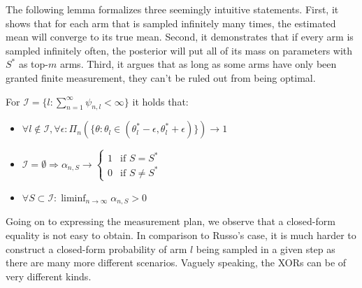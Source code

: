 The following lemma formalizes three seemingly intuitive statements. First,
it shows that for each arm that is sampled infinitely many times, the estimated
mean will converge to its true mean. Second, it demonstrates that if every arm
is sampled infinitely often, the posterior will put all of its mass on
parameters with $S^*$ as top-$m$ arms. Third, it argues that as long as some
arms have only been granted finite measurement, they can't be ruled out from
being optimal.
\begin{lemma}\label{lemma:finite_measurement}
  For $\mathcal{I} = \{l: \sum_{n=1}^\infty \psi_{n, l} < \infty\}$ it holds
      that:
  \begin{itemize}
    \item $\forall l \notin \mathcal{I}, \forall \epsilon: \Pi_n(\{\theta:
        \theta_l \in (\theta^*_l - \epsilon, \theta^*_l + \epsilon)\})
        \rightarrow 1$
    \item $\mathcal{I} = \emptyset \Rightarrow
    \alpha_{n, S} \rightarrow \begin{cases}
      1 & \text{if } S = S^*\\
      0 & \text{if } S \neq S^*
    \end{cases}$
    \item $\forall S \subset \mathcal{I}: \liminf_{n \rightarrow \infty}
        \alpha_{n, S} > 0$
  \end{itemize}
\end{lemma}
Going on to expressing the measurement plan, we observe that a closed-form
equality is not easy to obtain. In comparison to Russo's case, it is much harder
to construct a closed-form probability of arm $l$ being sampled in a given step
as there are many more different scenarios. Vaguely speaking, the XORs can be of
very different kinds.

